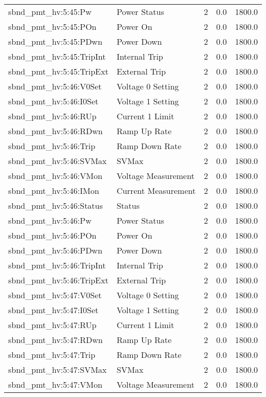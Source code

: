 \begin{center}
\begin{longtable}{l | l l l l }
sbnd\_pmt\_hv:5:45:Pw & Power Status & 2 & 0.0 & 1800.0\\ 
sbnd\_pmt\_hv:5:45:POn & Power On & 2 & 0.0 & 1800.0\\ 
sbnd\_pmt\_hv:5:45:PDwn & Power Down & 2 & 0.0 & 1800.0\\ 
sbnd\_pmt\_hv:5:45:TripInt & Internal Trip & 2 & 0.0 & 1800.0\\ 
sbnd\_pmt\_hv:5:45:TripExt & External Trip & 2 & 0.0 & 1800.0\\ 
sbnd\_pmt\_hv:5:46:V0Set & Voltage 0 Setting & 2 & 0.0 & 1800.0\\ 
sbnd\_pmt\_hv:5:46:I0Set & Voltage 1 Setting & 2 & 0.0 & 1800.0\\ 
sbnd\_pmt\_hv:5:46:RUp & Current 1 Limit & 2 & 0.0 & 1800.0\\ 
sbnd\_pmt\_hv:5:46:RDwn & Ramp Up Rate & 2 & 0.0 & 1800.0\\ 
sbnd\_pmt\_hv:5:46:Trip & Ramp Down Rate & 2 & 0.0 & 1800.0\\ 
sbnd\_pmt\_hv:5:46:SVMax & SVMax & 2 & 0.0 & 1800.0\\ 
sbnd\_pmt\_hv:5:46:VMon & Voltage Measurement & 2 & 0.0 & 1800.0\\ 
sbnd\_pmt\_hv:5:46:IMon & Current Measurement & 2 & 0.0 & 1800.0\\ 
sbnd\_pmt\_hv:5:46:Status & Status & 2 & 0.0 & 1800.0\\ 
sbnd\_pmt\_hv:5:46:Pw & Power Status & 2 & 0.0 & 1800.0\\ 
sbnd\_pmt\_hv:5:46:POn & Power On & 2 & 0.0 & 1800.0\\ 
sbnd\_pmt\_hv:5:46:PDwn & Power Down & 2 & 0.0 & 1800.0\\ 
sbnd\_pmt\_hv:5:46:TripInt & Internal Trip & 2 & 0.0 & 1800.0\\ 
sbnd\_pmt\_hv:5:46:TripExt & External Trip & 2 & 0.0 & 1800.0\\ 
sbnd\_pmt\_hv:5:47:V0Set & Voltage 0 Setting & 2 & 0.0 & 1800.0\\ 
sbnd\_pmt\_hv:5:47:I0Set & Voltage 1 Setting & 2 & 0.0 & 1800.0\\ 
sbnd\_pmt\_hv:5:47:RUp & Current 1 Limit & 2 & 0.0 & 1800.0\\ 
sbnd\_pmt\_hv:5:47:RDwn & Ramp Up Rate & 2 & 0.0 & 1800.0\\ 
sbnd\_pmt\_hv:5:47:Trip & Ramp Down Rate & 2 & 0.0 & 1800.0\\ 
sbnd\_pmt\_hv:5:47:SVMax & SVMax & 2 & 0.0 & 1800.0\\ 
sbnd\_pmt\_hv:5:47:VMon & Voltage Measurement & 2 & 0.0 & 1800.0\\ 

\end{longtable}
\end{center}
